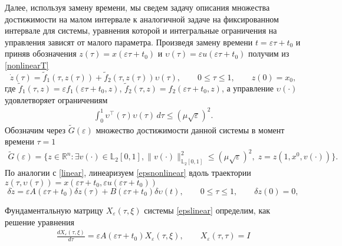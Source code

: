 \documentclass[../main.tex]{subfiles}
\begin{document}
	Далее, используя замену времени, мы сведем задачу описания множества достижимости на малом интервале к аналогичной задаче на фиксированном интервале для системы, уравнения которой и интегральные ограничения на управления зависят от малого параметра.
    Произведя замену времени
    $ t = \varepsilon \tau + t_0 $ и приняв обозначения $ z(\tau) = x(\varepsilon \tau + t_0) $ и $ \upsilon(\tau) = \varepsilon u(\varepsilon \tau + t_0) $  получим из \eqref{nonlinearT}
        \begin{equation}\label{epsnonlinear}
    	\dot{z}(\tau)=\widetilde{f}_1(\tau,z(\tau))+\widetilde{f}_2(\tau,z(\tau))\upsilon(\tau), \qquad 0 \leqslant \tau \leqslant 1, \qquad z(0) = x_0,
    \end{equation}
    где $ \widetilde{f}_1(\tau,z) = \varepsilon f_1(\varepsilon \tau + t_0,z) $, $ \widetilde{f}_2 (\tau,z) = f_2(\varepsilon \tau + t_0,z)$, а управление $ \upsilon(\cdot) $ удовлетворяет ограничениям
    \begin{gather}\label{epscond}
    	\int_0^1 \upsilon^{\top}(\tau) \upsilon(\tau) \, d\tau \leqslant \left( \mu \sqrt{\varepsilon}\right)^2.
    \end{gather}
    Обозначим через $\widetilde{G}(\varepsilon)$ множество достижимости данной системы в момент времени $\tau=1$
    \begin{gather*}
    	\widetilde{G}(\varepsilon)=\{z\in \mathbb{R}^n:\exists v(\cdot)\in \mathbb{L}_2[0,1],  \lVert v(\cdot)\rVert^2_{\mathbb{L}_2[0,1]}
    	\leqslant \left( \mu \sqrt{\varepsilon}\right)^2, \; z=z(1,x^0,v(\cdot))\}.
    \end{gather*}
    По аналогии с \eqref{linear}, линеаризуем \eqref{epsnonlinear} вдоль траектории $ z(\tau,\upsilon(\tau)) = x(\varepsilon \tau + t_0,\varepsilon u(\varepsilon \tau + t_0)) $
    \begin{equation}\label{epslinear}
    	\delta\dot{z} = \varepsilon A(\varepsilon \tau + t_0)\delta z(\tau) + B(\varepsilon \tau + t_0)\delta \upsilon(t),\qquad 0 \leqslant \tau \leqslant 1, \qquad \delta z(0) = 0,
    \end{equation}

	Фундаментальную матрицу $ X_{\varepsilon}(\tau,\xi) $ системы \eqref{epslinear} определим, как решение уравнения
\begin{gather*}
	\frac{dX_{\varepsilon}(\tau,\xi)}{d\tau} = \varepsilon A(\varepsilon \tau + t_0) X_{\varepsilon}(\tau,\xi), \qquad X_{\varepsilon}(\tau,\tau) = I
\end{gather*}
\end{document}

